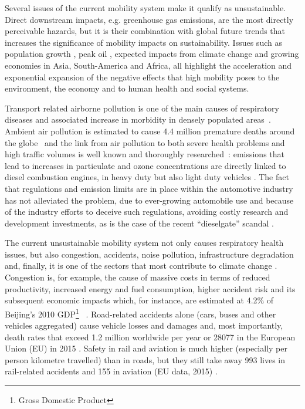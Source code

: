 Several issues of the current mobility system make it qualify as unsustainable. Direct downstream impacts, e.g. greenhouse gas emissions, are the most directly perceivable hazards, but it is their combination with global future trends that increases the significance of mobility impacts on sustainability. Issues such as population growth \parencite{un-desa2015_WorldPopulationProspects,kc2017_humancoreshared}, peak oil \parencite{kerr2011_Peakoilproduction}, expected impacts from climate change and growing economies in Asia, South-America and Africa, all highlight the acceleration and exponential expansion of the negative effects that high mobility poses to the environment, the economy and to human health and social systems.

Transport related airborne pollution is one of the main causes of respiratory diseases and associated increase in morbidity in densely populated areas~\parencite{vimercati2011_Trafficrelatedair,who2006_Airqualityguidelines}. Ambient air pollution is estimated to cause 4.4 million premature deaths around the globe~\parencite{forouzanfar2016_Globalregionalnational} and the link from air pollution to both severe health problems and high traffic volumes is well known and thoroughly researched~\parencite{who2006_Airqualityguidelines}:  emissions that lead to increases in  particulate and ozone concentrations are directly linked to diesel combustion engines, in heavy duty but also light duty vehicles \parencite{anenberg2017_Impactsmitigationexcess}. The fact that regulations and emission limits are in place within the automotive industry has not alleviated the problem, due to ever-growing automobile use and because of the industry efforts to deceive such regulations, avoiding costly research and development investments, as is the case of the recent ``dieselgate'' scandal \parencite{guardian2017_Volkswagenrevealsrecord}.

The current unsustainable mobility system not only causes respiratory health issues, but also congestion, accidents, noise pollution, infrastructure degradation and, finally, it is one of the sectors that most contribute to climate change \parencite{korzhenevych2014_UpdateHandbookExternal}. Congestion is, for example, the cause of massive costs in terms of reduced productivity, increased energy and fuel consumption, higher accident risk and its subsequent economic impacts which, for instance, are estimated at 4.2\% of Beijing's 2010 GDP\footnote{Gross Domestic Product} ~\parencite{li-zeng2012_SocialCostTraffic}. Road-related accidents alone (cars, buses and other vehicles aggregated) cause vehicle losses and damages and, most importantly, death rates that exceed 1.2 million worldwide per year or \num{28077} in the European Union (EU) in 2015 \parencite{who2017_GlobalHealthObservatory}. Safety in rail and aviation is much higher (especially per person kilometre travelled) than in roads, but they still take away 993 lives in rail-related accidents and 155 in aviation (EU data, 2015) \parencite{eurostat2017_StatisticsExplainedRailway,eurostat2017_EurostatOnlineDatabase}.

